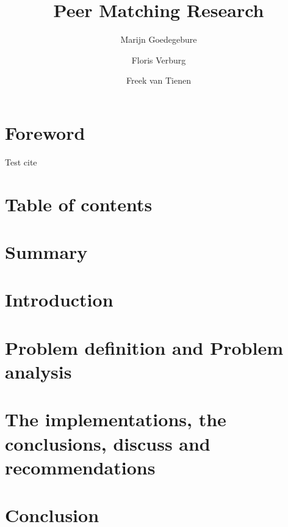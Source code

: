 \documentclass[]{article}
\title{Peer Matching Research}
\author{Marijn Goedegebure \and
	Floris Verburg \and
	Freek van Tienen}
\date{}
\begin{document}
\maketitle

\section{Foreword}
Test cite \citet{brucker99}

\section{Table of contents}

\section{Summary}

\section{Introduction}

\section{Problem definition and Problem analysis}

\section{The implementations,	the conclusions, discuss and recommendations}

\section{Conclusion}

\newpage


\end{document}
